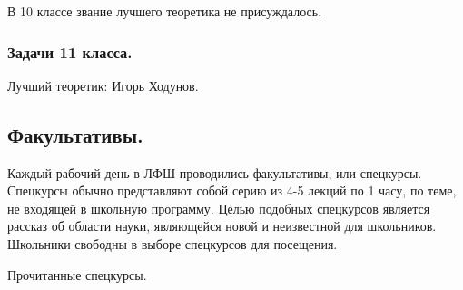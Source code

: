\documentclass[12pt,a4paper,oneside,draft]{scrartcl}
\newcounter{notask}
\newlength{\h}
\newlength{\x}
\begin{document}
В 10 классе звание лучшего теоретика не присуждалось. 

\subsubsection{Задачи 11 класса.}
\label{sec:2-a-day_11}

\setcounter{notask}{1}
\vspace{1cm}

Лучший теоретик: Игорь Ходунов. 

\subsection{Факультативы.}
\label{sec:elective}

Каждый рабочий день в ЛФШ проводились факультативы, или
спецкурсы. Спецкурсы обычно представляют собой серию из 4-5 лекций по
1 часу, по теме, не входящей в школьную программу. Целью подобных
спецкурсов является рассказ об области науки, являющейся новой и
неизвестной для школьников. Школьники свободны в выборе спецкурсов для
посещения.

\begin{center}
\textsf{Прочитанные спецкурсы.}  
\end{center}
\end{document}
